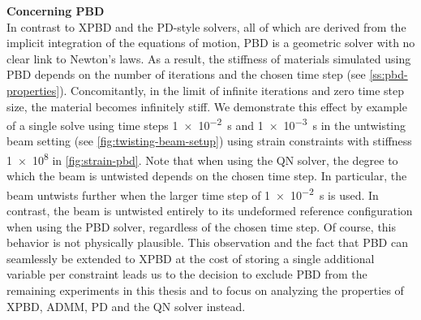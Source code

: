 \noindent \textbf{Concerning PBD}\\
\noindent In contrast to XPBD and the PD-style solvers, all of which are derived from the implicit integration of the equations of motion, PBD is a geometric solver with no 
clear link to Newton's laws. As a result, the stiffness of materials simulated using PBD depends on the number of iterations and the 
chosen time step (see \cref{ss:pbd-properties}). Concomitantly, in the limit of infinite iterations and zero time step size, the material becomes infinitely stiff. 
We demonstrate this effect by example of a single solve using time steps \SI{1e-2}{\second} and \SI{1e-3}{\second} in the 
untwisting beam setting (see \cref{fig:twisting-beam-setup}) using strain constraints with stiffness \num{1e8} in \autoref{fig:strain-pbd}. Note that when using the QN 
solver, the degree to which the beam is untwisted depends on the chosen time step. In particular, the beam untwists further when the larger time step of \SI{1e-2}{\second} 
is used. In contrast, the beam is untwisted entirely to its undeformed reference configuration when using the PBD solver, regardless of the chosen time step. Of course, this 
behavior is not physically plausible. This observation and the fact that PBD can seamlessly be extended to XPBD at the cost of storing a single additional variable per 
constraint leads us to the decision to exclude PBD from the remaining experiments in this thesis and to focus on analyzing the properties of XPBD, ADMM, PD and the QN solver 
instead.

